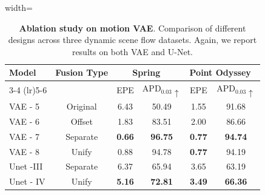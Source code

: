 \begin{table}[t]
\centering
\caption{\textbf{Ablation study on motion VAE}.
Comparison of different designs across three dynamic scene flow datasets.
Again, we report results on both VAE and U-Net.
}
\label{tab:ablation_motion}
\vspace{-0.5em}
\begin{adjustbox}{width=\linewidth}
\begin{tabular}{@{}l c cc cc@{}}
\toprule
\multirow{2}{*}{\textbf{Model}} & 
\multirow{2}{*}{\textbf{Fusion Type}} & 
\multicolumn{2}{c}{\textbf{Spring}~\cite{Mehl2023_Spring}} &
\multicolumn{2}{c}{\textbf{Point Odyssey}~\cite{zheng2023pointodyssey}} \\
\cmidrule(lr){3-4} \cmidrule(lr){5-6}
 &  & EPE & APD$_{0.03}\uparrow$ & EPE & APD$_{0.03}\uparrow$ \\
\midrule
VAE - 5 & Original &  6.43 & 50.49 & 1.55 & 91.68 \\
VAE - 6 & Offset &  1.83 & 83.51 & 2.00 & 86.66 \\
VAE - 7 & Separate &  \textbf{0.66} & \textbf{96.75} & \textbf{0.77} & \textbf{94.74} \\
VAE - 8 & Unify &  0.88 & 94.78 & \textbf{0.77} & 94.19 \\
\midrule
Unet -III & Separate & 6.37 & 65.94 & 3.65 & 63.19 \\
Unet - IV & Unify & \textbf{5.16} & \textbf{72.81} & \textbf{3.49} & \textbf{66.36} \\
\bottomrule
\end{tabular}
\end{adjustbox}
\vspace{-0.5em}
\end{table}
